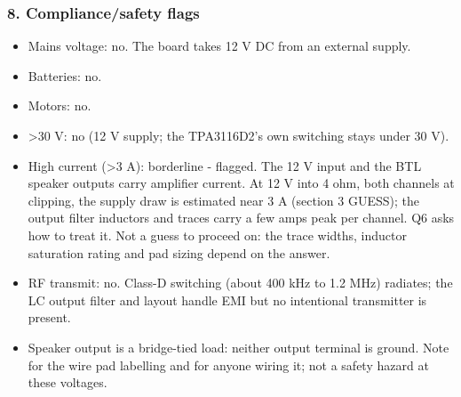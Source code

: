 \documentclass[11pt]{article}
\begin{document}
\subsubsection*{8. Compliance/safety flags}
\begin{itemize}
\item Mains voltage: no. The board takes 12 V DC from an external supply.
\item Batteries: no.
\item Motors: no.
\item \textgreater{}30 V: no (12 V supply; the TPA3116D2's own switching stays under 30 V).
\item High current (\textgreater{}3 A): borderline - flagged. The 12 V input and the BTL speaker outputs carry
amplifier current. At 12 V into 4 ohm, both channels at clipping, the supply draw is estimated
near 3 A (section 3 GUESS); the output filter inductors and traces carry a few amps peak per
channel. Q6 asks how to treat it. Not a guess to proceed on: the trace widths, inductor
saturation rating and pad sizing depend on the answer.
\item RF transmit: no. Class-D switching (about 400 kHz to 1.2 MHz) radiates; the LC output filter
and layout handle EMI but no intentional transmitter is present.
\item Speaker output is a bridge-tied load: neither output terminal is ground. Note for the wire pad
labelling and for anyone wiring it; not a safety hazard at these voltages.
\end{itemize}
\end{document}
